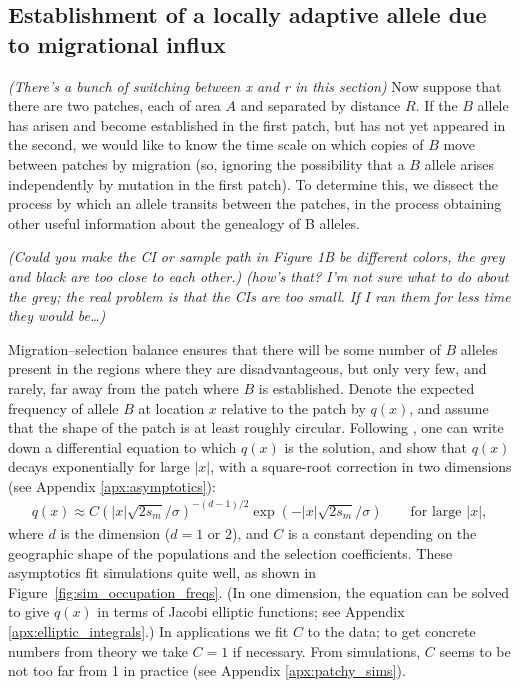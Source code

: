 \documentclass{article}
\newcommand{\gc}[1]{{\it\color{green}(#1)} }
\newcommand{\plr}[1]{{\it\color{blue}(#1)}}
\begin{document}
\subsection{Establishment of a locally adaptive allele due to migrational influx}
\label{ss:patchymigration}
\gc{There's a bunch of switching between x and r in this section}
Now suppose that there are two patches, each of area $A$ and separated by distance $R$. 
If the $B$ allele has arisen and become established in the first patch, but has not yet appeared in the second,
we would like to know the time scale on which copies of $B$ move between patches by migration
(so, ignoring the possibility that a $B$ allele arises independently by mutation in the first patch).
To determine this, we dissect the process by which an allele transits between the patches,
in the process obtaining other useful information about the genealogy of B alleles.

\gc{Could you make the CI or sample path in Figure 1B be different colors, the grey and black are too close to each other.}
\plr{how's that?  I'm not sure what to do about the grey; the real problem is that the CIs are too small. If I ran them for less time they would be\dots}

Migration--selection balance ensures that 
there will be some number of $B$ alleles present in the regions where they are disadvantageous,
but only very few, and rarely, far away from the patch where $B$ is established.
Denote the expected frequency of allele $B$ at location $x$ relative to the patch by $q(x)$,
and assume that the shape of the patch is at least roughly circular.
Following \citet{slatkin1973geneflow}, one can write down a differential equation to which $q(x)$ is the solution,
and show that $q(x)$ decays exponentially for large $|x|$,
with a square-root correction in two dimensions (see Appendix \ref{apx:asymptotics}): 
\begin{align} \label{eqn:eqfreq}
  q(x) \approx C \left( |x| \sqrt{2 s_m}/\sigma \right)^{-(d-1)/2} \exp( - |x| \sqrt{2 s_m} / \sigma) \qquad \text{for large $|x|$},
\end{align}
where $d$ is the dimension ($d=1$ or $2$), and $C$ is a constant depending on the geographic shape of the populations and the selection coefficients.
These asymptotics fit simulations quite well, as shown in Figure~\ref{fig:sim_occupation_freqs}.
(In one dimension, the equation can be solved to give $q(x)$ in terms of Jacobi elliptic functions; see Appendix \ref{apx:elliptic_integrals}.)
In applications we fit $C$ to the data;
to get concrete numbers from theory we take $C=1$ if necessary.
From simulations, $C$ seems to be not too far from 1 in practice (see Appendix \ref{apx:patchy_sims}).
\end{document}
